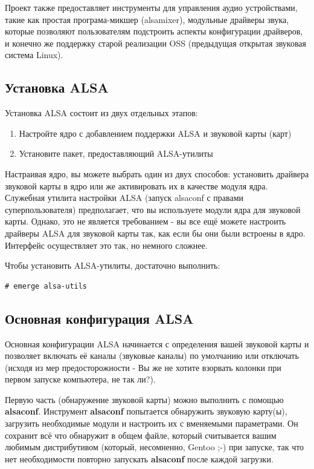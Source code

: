 \documentclass[10pt]{book}
\begin{document}
Проект также предоставляет инструменты для управления аудио устройствами, такие как простая програма-микшер (alsamixer), модульные драйверы звука, которые позволяют пользователям подстроить аспекты конфигурации драйверов, и конечно же поддержку старой реализации OSS (предыдущая открытая звуковая система Linux).

\subsection{Установка ALSA}
Установка ALSA состоит из двух отдельных этапов:
\begin{enumerate}
\item Настройте ядро с добавлением поддержки ALSA и звуковой карты (карт)
\item Установите пакет, предоставляющий ALSA-утилиты
\end{enumerate}

Настраивая ядро, вы можете выбрать один из двух способов: установить драйвера звуковой карты в ядро или же активировать их в качестве модуля ядра. Служебная утилита настройки ALSA (запуск alsaconf с правами суперпользователя) предполагает, что вы используете модули ядра для звуковой карты. Однако, это не является требованием - вы все ещё можете настроить драйверы ALSA для звуковой карты так, как если бы они были встроены в ядро. Интерфейс осуществляет это так, но немного сложнее.

Чтобы установить ALSA-утилиты, достаточно выполнить:

\begin{tcolorbox}
\begin{lstlisting}
# emerge alsa-utils
\end{lstlisting}
\end{tcolorbox}

\subsection{Основная конфигурация ALSA}
Основная конфигурации ALSA начинается с определения вашей звуковой карты и позволяет включать её каналы (звуковые каналы) по умолчанию или отключать (исходя из мер предосторожности - Вы же не хотите взорвать колонки при первом запуске компьютера, не так ли?). 

Первую часть (обнаружение звуковой карты) можно выполнить с помощью \textbf{alsaconf}. Инструмент \textbf{alsaconf} попытается обнаружить звуковую карту(ы), загрузить необходимые модули и настроить их с вменяемыми параметрами. Он сохранит всё что обнаружит в общем файле, который считывается вашим любимым дистрибутивом (который, несомненно, Gentoo ;-) при запуске, так что нет необходимости повторно запускать \textbf{alsaconf} после каждой загрузки.
\end{document}
